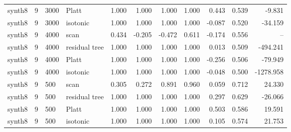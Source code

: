 \begin{tabular}{lrllrrrrrrr}
synth8 & 9 & 3000 & Platt & 1.000 & 1.000 & 1.000 & 1.000 & 0.443 & 0.539 & -9.831 \\
synth8 & 9 & 3000 & isotonic & 1.000 & 1.000 & 1.000 & 1.000 & -0.087 & 0.520 & -34.159 \\
synth8 & 9 & 4000 & scan & 0.434 & -0.205 & -0.472 & 0.611 & -0.174 & 0.556 & -- \\
synth8 & 9 & 4000 & residual tree & 1.000 & 1.000 & 1.000 & 1.000 & 0.013 & 0.509 & -494.241 \\
synth8 & 9 & 4000 & Platt & 1.000 & 1.000 & 1.000 & 1.000 & -0.256 & 0.506 & -79.949 \\
synth8 & 9 & 4000 & isotonic & 1.000 & 1.000 & 1.000 & 1.000 & -0.048 & 0.500 & -1278.958 \\
synth8 & 9 & 500 & scan & 0.305 & 0.272 & 0.891 & 0.960 & 0.059 & 0.712 & 24.330 \\
synth8 & 9 & 500 & residual tree & 1.000 & 1.000 & 1.000 & 1.000 & 0.297 & 0.629 & -26.066 \\
synth8 & 9 & 500 & Platt & 1.000 & 1.000 & 1.000 & 1.000 & 0.503 & 0.586 & 19.591 \\
synth8 & 9 & 500 & isotonic & 1.000 & 1.000 & 1.000 & 1.000 & 0.105 & 0.574 & 21.753 \\
\bottomrule
\end{tabular}

